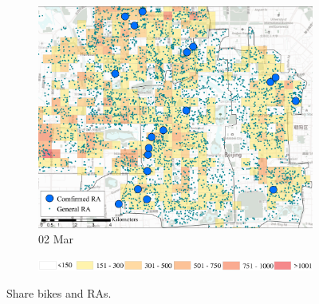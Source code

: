 \documentclass[preprints,article,accept,moreauthors,pdftex]{Definitions/mdpi}
\begin{document}
\begin{figure}[H]
\begin{subfigure}{.32\textwidth}
        \includegraphics[width=\textwidth]{Figures/Relation_with_POIs/POIsRAD2020_03_02.pdf}
        \caption{02 Mar}
    \end{subfigure}

    \vspace{6pt}
    \begin{subfigure}{.7\textwidth}
        \includegraphics[width=\textwidth]{Figures/AppendixLegend2.eps}
    \end{subfigure}
    \caption{Share bikes and RAs.}
    \label{fig:BSS_communities}
\end{figure}

\end{document}
